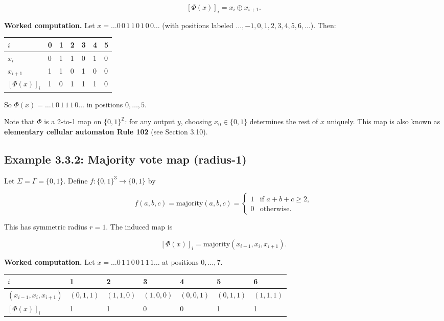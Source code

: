 \[
[\Phi(x)]_i = x_i \oplus x_{i+1}.
\]

\textbf{Worked computation.} Let $x = \ldots 0\, 0\, 1\, 1\, 0\, 1\, 0\, 0 \ldots$ (with positions labeled $\ldots, -1, 0, 1, 2, 3, 4, 5, 6, \ldots$). Then:

\begin{tabular}{|l|l|l|l|l|l|l|}
\hline
$i$ & 0 & 1 & 2 & 3 & 4 & 5 \\
\hline
$x_i$ & 0 & 1 & 1 & 0 & 1 & 0 \\
$x_{i+1}$ & 1 & 1 & 0 & 1 & 0 & 0 \\
$[\Phi(x)]_i$ & 1 & 0 & 1 & 1 & 1 & 0 \\
\hline
\end{tabular}


So $\Phi(x) = \ldots 1\, 0\, 1\, 1\, 1\, 0 \ldots$ in positions $0, \ldots, 5$.

Note that $\Phi$ is a 2-to-1 map on $\{ 0,1\} ^\mathbb{Z}$: for any output $y$, choosing $x_0 \in \{ 0,1\} $ determines the rest of $x$ uniquely. This map is also known as \textbf{elementary cellular automaton Rule 102} (see Section 3.10).

\subsection{Example 3.3.2: Majority vote map (radius-1)}

Let $\Sigma = \Gamma = \{ 0, 1\} $. Define $f: \{ 0,1\} ^3 \to \{ 0,1\} $ by

\[
f(a, b, c) = \text{majority}(a, b, c) = \begin{cases} 1 & \text{if } a + b + c \geq 2, \\ 0 & \text{otherwise.} \end{cases}
\]

This has symmetric radius $r = 1$. The induced map is

\[
[\Phi(x)]_i = \text{majority}(x_{i-1}, x_i, x_{i+1}).
\]

\textbf{Worked computation.} Let $x = \ldots 0\, 1\, 1\, 0\, 0\, 1\, 1\, 1 \ldots$ at positions $0, \ldots, 7$.

\begin{tabular}{|l|l|l|l|l|l|l|}
\hline
$i$ & 1 & 2 & 3 & 4 & 5 & 6 \\
\hline
$(x_{i-1}, x_i, x_{i+1})$ & $(0,1,1)$ & $(1,1,0)$ & $(1,0,0)$ & $(0,0,1)$ & $(0,1,1)$ & $(1,1,1)$ \\
$[\Phi(x)]_i$ & 1 & 1 & 0 & 0 & 1 & 1 \\
\hline
\end{tabular}


